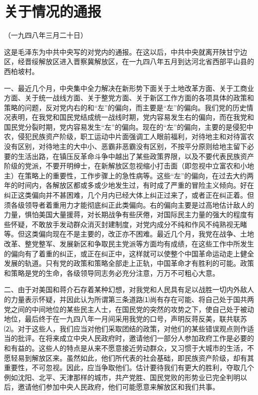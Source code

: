 \documentclass[UTF-8, a5paper, 12pt]{ctexart}
\begin{document}
\section{关于情况的通报}

（一九四八年三月二十日）

这是毛泽东为中共中央写的对党内的通报。在这以后，中共中央就离开陕甘宁边区，经晋绥解放区进入晋察冀解放区，在一九四八年五月到达河北省西部平山县的西柏坡村。

一、最近几个月，中央集中全力解决在新形势下面关于土地改革方面、关于工商业方面、关于统一战线方面、关于整党方面、关于新区工作方面的各项具体的政策和策略的问题，反对党内右的和“左”的偏向，而主要是“左”的偏向。我们党的历史情况表明，在我党和国民党结成统一战线时期，党内容易发生右的偏向，而在我党和国民党分裂时期，党内容易发生“左”的偏向。现在的“左”的偏向，主要的是侵犯中农，侵犯民族资产阶级，职工运动中片面强调工人眼前福利，对待地主和对待富农没有区别，对待地主的大中小、恶霸非恶霸没有区别，不按平分原则给地主留下必要的生活出路，在镇压反革命斗争中越出了某些政策界限，以及不要代表民族资产阶级的党派，不要开明绅士，在新解放区忽视缩小打击面（即忽视中立富农和小地主）在策略上的重要性，工作步骤上的急性病等。这些“左”的偏向，在过去大约两年的时间内，各解放区都或多或少地发生过，有时成了严重的冒险主义倾向。好在纠正这类偏向并不甚困难，几个月内已经大体上纠正过来了，或者正在纠正着。但须各级领导者着重用力才能彻底纠正此类偏向。右的偏向主要是过高地估计敌人的力量，惧怕美国大量援蒋，对长期战争有些厌倦，对国际民主力量的强大的程度有些怀疑，不敢放手发动群众消灭封建制度，对党内成分不纯和作风不纯熟视无睹等。但这类偏向现在不是主要的，改正亦不困难。最近几个月，我党在战争、土地改革、整党整军、发展新区和争取民主党派等方面均有成绩，在这些工作中所发生的偏向有了着重的纠正，或正在纠正中，这样就可以使整个中国革命运动走上健全发展的轨道。只有党的政策和策略全部走上正轨，中国革命才有胜利的可能。政策和策略是党的生命，各级领导同志务必充分注意，万万不可粗心大意。

二、由于对美国和蒋介石存着某种幻想，对我党和人民具有足以战胜一切内外敌人的力量表示怀疑，并因此认为所谓第三条道路⑴尚有存在可能、将自己处于国共两党之间的中间地位的某些民主人士，在国民党的突然的攻势之下，使自己处于被动地位，最后终于在一九四八年一月间采用我党的口号，声明反蒋反美，联共联苏⑵。对于这些人，我们应当对他们采取团结的政策，对他们的某些错误观点则作适当的批评。在将来成立中央人民政府时，邀请他们一部分人参加政府工作是必要的和有益的。这些人的特点是从来不愿意接近劳动群众，又习惯于大城市的生活，不愿轻易到解放区来。虽然如此，他们所代表的社会基础，即民族资产阶级，却有其重要性，不可忽视。因此，应当争取他们。估计要待我们有更大的胜利，夺取几个例如沈阳、北平、天津那样的城市，共产党胜、国民党败的形势业已完全判明以后，邀请他们参加中央人民政府，他们可能愿意来解放区和我们共事。
\end{document}
